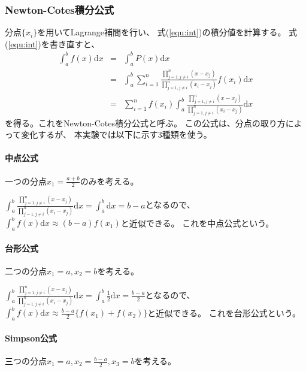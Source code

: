 \documentclass[a4j, titlepage]{jsarticle}
\numberwithin{equation}{section}
\begin{document}
        \subsubsection{Newton-Cotes積分公式}
            分点$\{x_i\}$を用いてLagrange補間を行い、
            式(\ref{equ:int})の積分値を計算する。
            式(\ref{equ:int})を書き直すと、
            \begin{eqnarray*}
                \int_a^bf(x)\mathrm{d}x &=& \int_a^bP(x)\mathrm{d}x \\
                &=& \int_a^b\sum_{i=1}^n\frac{\displaystyle\prod_{j=1,j\neq i}^n (x-x_j)}{\displaystyle\prod_{j=1,j\neq i}^n (x_i-x_j)}f(x_i)\mathrm{d}x \\
                &=& \sum_{i=1}^nf(x_i)\int_a^b\frac{\displaystyle\prod_{j=1,j\neq i}^n (x-x_j)}{\displaystyle\prod_{j=1,j\neq i}^n (x_i-x_j)}\mathrm{d}x
            \end{eqnarray*}
            を得る。これをNewton-Cotes積分公式と呼ぶ。
            この公式は、分点の取り方によって変化するが、
            本実験では以下に示す3種類を使う。

            \paragraph{中点公式}
                一つの分点$x_1 = \displaystyle\frac{a + b}{2}$のみを考える。

                $\displaystyle\int_a^b\frac{\displaystyle\prod_{j=1,j\neq i}^n (x-x_j)}{\displaystyle\prod_{j=1,j\neq i}^n (x_i-x_j)}\mathrm{d}x=\int_a^b\mathrm{d}x=b-a$となるので、
                $\displaystyle\int_a^bf(x)\mathrm{d}x\approx(b-a)f(x_1)$と近似できる。
                これを中点公式という。

            \paragraph{台形公式}
                二つの分点$x_1 = a, x_2 = b$を考える。

                $\displaystyle\int_a^b\frac{\displaystyle\prod_{j=1,j\neq i}^n (x-x_j)}{\displaystyle\prod_{j=1,j\neq i}^n (x_i-x_j)}\mathrm{d}x=\int_a^b\frac{1}{2}\mathrm{d}x=\frac{b-a}{2}$となるので、
                $\displaystyle\int_a^bf(x)\mathrm{d}x\approx\frac{b-a}{2}\{f(x_1)+f(x_2)\}$と近似できる。
                これを台形公式という。

            \paragraph{Simpson公式}
                三つの分点$x_1 = a, x_2 = \displaystyle\frac{b-a}{2}, x_3 = b$を考える。
\end{document}
